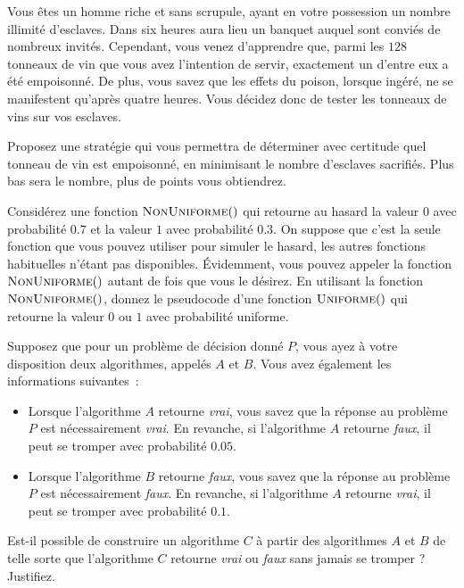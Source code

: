 \documentclass[12pt,addpoints]{exam}
\begin{document}
\begin{questions}
\question
Vous êtes un homme riche et sans scrupule, ayant en votre possession un nombre illimité d'esclaves. Dans six heures aura lieu un banquet auquel sont conviés de nombreux invités. Cependant, vous venez d'apprendre que, parmi les $128$ tonneaux de vin que vous avez l'intention de servir, exactement un d'entre eux a été empoisonné. De plus, vous savez que les effets du poison, lorsque ingéré, ne se manifestent qu'après quatre heures. Vous décidez donc de tester les tonneaux de vins sur vos esclaves.

Proposez une stratégie qui vous permettra de déterminer avec certitude quel tonneau de vin est empoisonné, en minimisant le nombre d'esclaves sacrifiés. Plus bas sera le nombre, plus de points vous obtiendrez.


\question
Considérez une fonction $\Call{NonUniforme}$ qui retourne au hasard la valeur $0$ avec probabilité $0.7$ et la valeur $1$ avec probabilité $0.3$. On suppose que c'est la seule fonction que vous pouvez utiliser pour simuler le hasard, les autres fonctions habituelles n'étant pas disponibles. Évidemment, vous pouvez appeler la fonction $\Call{NonUniforme}$ autant de fois que vous le désirez. En utilisant la fonction $\Call{NonUniforme}$, donnez le pseudocode d'une fonction $\Call{Uniforme}$ qui retourne la valeur $0$ ou $1$ avec probabilité uniforme.
\begin{solution}
\end{solution}

\question
Supposez que pour un problème de décision donné $P$, vous ayez à votre disposition deux algorithmes, appelés $A$ et $B$. Vous avez également les informations suivantes~:
\begin{itemize}
  \item Lorsque l'algorithme $A$ retourne \emph{vrai}, vous savez que la réponse au problème $P$ est nécessairement \emph{vrai}. En revanche, si l'algorithme $A$ retourne \emph{faux}, il peut se tromper avec probabilité $0.05$.
  \item Lorsque l'algorithme $B$ retourne \emph{faux}, vous savez que la réponse au problème $P$ est nécessairement \emph{faux}. En revanche, si l'algorithme $A$ retourne \emph{vrai}, il peut se tromper avec probabilité $0.1$.
\end{itemize}
Est-il possible de construire un algorithme $C$ à partir des algorithmes $A$ et $B$ de telle sorte que l'algorithme $C$ retourne \emph{vrai} ou \emph{faux} sans jamais se tromper ? Justifiez.


\end{questions}
\end{document}
